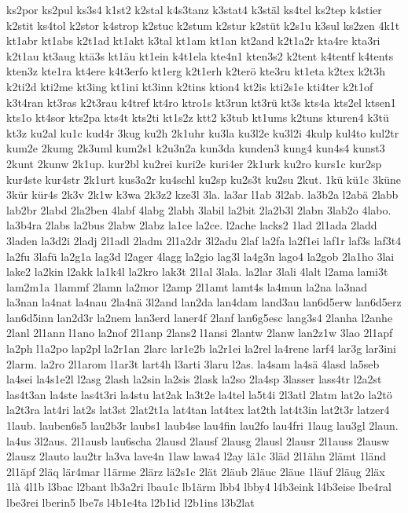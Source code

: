 {ks2por
ks2pul
ks3s4
k1st2
k2stal
k4s3tanz
k3stat4
k3stäl
ks4tel
ks2tep
k4stier
k2stit
ks4tol
k2stor
k4strop
k2stuc
k2stum
k2stur
k2stüt
k2s1u
k3sul
ks2zen
4k1t
kt1abr
kt1abs
k2t1ad
kt1akt
k3tal
kt1am
kt1an
kt2and
k2t1a2r
kta4re
kta3ri
k2t1au
kt3aug
ktä3s
kt1äu
kt1ein
k4t1ela
kte4n1
kten3s2
k2tent
k4tentf
k4tents
kten3z
kte1ra
kt4ere
k4t3erfo
kt1erg
k2t1erh
k2terö
kte3ru
kt1eta
k2tex
k2t3h
k2ti2d
kti2me
kt3ing
kt1ini
kt3inn
k2tins
ktion4
kt2is
kti2s1e
kti4ter
k2t1of
k3t4ran
kt3ras
k2t3rau
k4tref
kt4ro
ktro1s
kt3run
kt3rü
kt3s
kts4a
kts2el
ktsen1
kts1o
kt4sor
kts2pa
kts4t
kts2ti
kt1s2z
ktt2
k3tub
kt1ums
k2tuns
kturen4
k3tü
kt3z
ku2al
ku1c
kud4r
3kug
ku2h
2k1uhr
ku3la
ku3l2e
ku3l2i
4kulp
kul4to
kul2tr
kum2e
2kumg
2k3uml
kum2s1
k2u3n2a
kun3da
kunden3
kung4
kun4s4
kunst3
2kunt
2kunw
2k1up.
kur2bl
ku2rei
kuri2e
kuri4er
2k1urk
ku2ro
kurs1c
kur2sp
kur4ste
kur4str
2k1urt
kus3a2r
ku4schl
ku2sp
ku2s3t
ku2su
2kut.
1kü
kü1c
3küne
3kür
kür4s
2k3v
2k1w
k3wa
2k3z2
kze3l
3la.
la3ar
l1ab
3l2ab.
la3b2a
l2abä
2labb
lab2br
2labd
2la2ben
4labf
4labg
2labh
3labil
la2bit
2la2b3l
2labn
3lab2o
4labo.
la3b4ra
2labs
la2bus
2labw
2labz
la1ce
la2ce.
l2ache
lacks2
1lad
2l1ada
2ladd
3laden
la3d2i
2ladj
2l1adl
2ladm
2l1a2dr
3l2adu
2laf
la2fa
la2f1ei
laf1r
laf3s
laf3t4
la2fu
3lafü
la2g1a
lag3d
l2ager
4lagg
la2gio
lag3l
la4g3n
lago4
la2gob
2la1ho
3lai
lake2
la2kin
l2akk
la1k4l
la2kro
lak3t
2l1al
3lala.
la2lar
3lali
4lalt
l2ama
lami3t
lam2m1a
1lammf
2lamn
la2mor
l2amp
2l1amt
lamt4s
la4mun
la2na
la3nad
la3nan
la4nat
la4nau
2la4nä
3l2and
lan2da
lan4dam
land3au
lan6d5erw
lan6d5erz
lan6d5inn
lan2d3r
la2nem
lan3erd
laner4f
2lanf
lan6g5esc
lang3s4
2lanha
l2anhe
2lanl
2l1ann
l1ano
la2nof
2l1anp
2lans2
l1ansi
2lantw
2lanw
lan2z1w
3lao
2l1apf
la2ph
l1a2po
lap2pl
la2r1an
2larc
lar1e2b
la2r1ei
la2rel
la4rene
larf4
lar3g
lar3ini
2larm.
la2ro
2l1arom
l1ar3t
lart4h
l3arti
3laru
l2as.
la4sam
la4sä
4lasd
la5seb
la4sei
la4s1e2l
l2asg
2lash
la2sin
la2sis
2lask
la2so
2la4sp
3lasser
lass4tr
l2a2st
las4t3an
la4ste
las4t3ri
la4stu
lat2ak
la3t2e
la4tel
la5t4i
2l3atl
2latm
lat2o
la2tö
la2t3ra
lat4ri
lat2s
lat3st
2lat2t1a
lat4tan
lat4tex
lat2th
lat4t3in
lat2t3r
latzer4
1laub.
lauben6s5
lau2b3r
laubs1
laub4se
lau4fin
lau2fo
lau4fri
1laug
lau3gl
2laun.
la4us
3l2aus.
2l1ausb
lau6scha
2lausd
2lausf
2lausg
2lausl
2lausr
2l1auss
2lausw
2lausz
2lauto
lau2tr
la3va
lave4n
1law
lawa4
l2ay
lä1c
3läd
2l1ähn
2lämt
1länd
2l1äpf
2läq
lär4mar
l1ärme
2lärz
lä2s1c
2lät
2läub
2läuc
2läue
1läuf
2läug
2läx
1là
4l1b
l3bac
l2bant
lb3a2ri
lbau1c
lb1ärm
lbb4
lbby4
l4b3eink
l4b3eise
lbe4ral
lbe3rei
lberin5
lbe7s
l4b1e4ta
l2b1id
l2b1ins
l3b2lat
}
